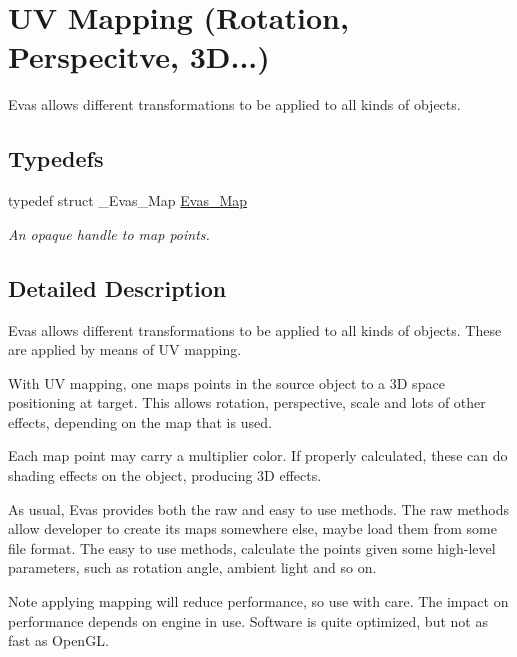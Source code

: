 \section{UV Mapping (Rotation, Perspecitve, 3D...)}
\label{group__Evas__Object__Group__Map}


Evas allows different transformations to be applied to all kinds of objects.  


\subsection*{Typedefs}
\begin{DoxyCompactItemize}
\item 
typedef struct \_\-Evas\_\-Map \hyperlink{group__Evas__Object__Group__Map_gae94fcea124ae4135e8bb15a014b334dc}{Evas\_\-Map}
\begin{DoxyCompactList}\small\item\em An opaque handle to map points. \item\end{DoxyCompactList}\end{DoxyCompactItemize}


\subsection{Detailed Description}
Evas allows different transformations to be applied to all kinds of objects. These are applied by means of UV mapping.

With UV mapping, one maps points in the source object to a 3D space positioning at target. This allows rotation, perspective, scale and lots of other effects, depending on the map that is used.

Each map point may carry a multiplier color. If properly calculated, these can do shading effects on the object, producing 3D effects.

As usual, Evas provides both the raw and easy to use methods. The raw methods allow developer to create its maps somewhere else, maybe load them from some file format. The easy to use methods, calculate the points given some high-\/level parameters, such as rotation angle, ambient light and so on.

\begin{DoxyNote}{Note}
applying mapping will reduce performance, so use with care. The impact on performance depends on engine in use. Software is quite optimized, but not as fast as OpenGL. 
\end{DoxyNote}


